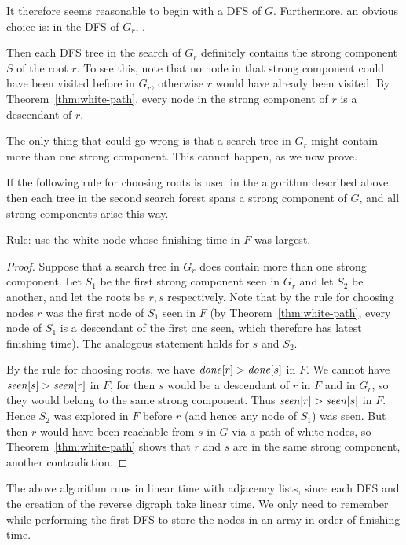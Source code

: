 It therefore seems reasonable to begin with a DFS of $G$. Furthermore,
an obvious choice is: in the DFS of $G_r$, .

Then each DFS tree in the search of $G_r$ definitely contains the strong
component $S$ of the root $r$. To see this, note that no node in that
strong component could have been visited before in $G_r$, otherwise $r$
would have already been visited. By Theorem~\ref{thm:white-path}, every
node in the strong component of $r$ is a descendant of $r$.

The only thing that could go wrong is that a search tree in $G_r$
might contain more than one strong component. This cannot happen,
as we now prove.

\begin{Theorem} \label{thm:scc-alg} 
If the following rule for choosing roots is used in the algorithm
described above, then each tree in the second search forest spans a
strong component of $G$, and all strong components arise this way.

Rule: use the white node whose finishing time in $F$ was largest.
\end{Theorem}

\begin{proof}
Suppose that a search tree in $G_r$ does  contain more than one strong
component. Let $S_1$ be the first strong component seen in $G_r$ and let
$S_2$ be another, and let the roots be $r, s$ respectively. Note that by
the rule for choosing nodes $r$ was the first node of $S_1$ seen in $F$
(by Theorem~\ref{thm:white-path}, every node of $S_1$ is a descendant
of the first one seen, which therefore has latest finishing time). The
analogous statement holds for $s$ and $S_2$.

By the rule for choosing roots, we have $\operatorname{\text{\textit{done}}}[r] > \operatorname{\text{\textit{done}}}[s]$ in $F$. We
cannot have $\operatorname{\text{\textit{seen}}}[s] > \operatorname{\text{\textit{seen}}}[r]$ in $F$, for then $s$ would be a descendant
of $r$ in $F$ and in $G_r$, so they would belong to the same strong
component. Thus $\operatorname{\text{\textit{seen}}}[r] > \operatorname{\text{\textit{seen}}}[s]$ in $F$. Hence $S_2$ was explored
in $F$ before $r$ (and hence any node of $S_1$) was seen. But then $r$
would have been reachable from $s$ in $G$ via a path of white nodes,
so Theorem~\ref{thm:white-path} shows that $r$ and $s$ are in the same
strong component, another contradiction.
\end{proof} 

The above algorithm runs in linear time with adjacency lists, since each
DFS and the creation of the reverse digraph take linear time. We only
need to remember  while performing the first DFS to store the nodes in
an array in order of finishing time. 

